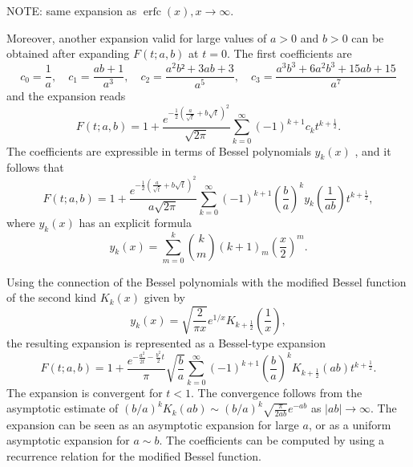 \documentclass[10pt,a4paper,oneside]{article}
\DeclareMathOperator{\erfc}{erfc}
\numberwithin{equation}{section}
\begin{document}
NOTE: same expansion as $\erfc(x), x \to \infty$.

Moreover, another expansion valid for large values of $a > 0$ and $b > 0$ can be obtained after expanding $F(t;a,b)$ at $t=0$. The first coefficients are
\begin{equation}
c_0 = \frac{1}{a}, \quad c_1 = \frac{ab + 1}{a^3}, \quad c_2 = \frac{a^2b² +3ab + 3}{a^5}, \quad c_3 = \frac{a^3b^3 + 6a^2b^3 + 15ab + 15}{a^7}
\end{equation}
and the expansion reads
\begin{equation}
F(t; a, b) = 1 + \frac{e^{-\frac{1}{2} \left(\frac{a}{\sqrt{t}} + b\sqrt{t} \right)^2}}{\sqrt{2\pi}}\sum_{k=0}^{\infty}(-1)^{k+1}c_k t^{k + \frac{1}{2}}.
\end{equation}
The coefficients are expressible in terms of Bessel polynomials $y_k(x)$ \cite[\S A001498]{OEIS}, and it follows that
\begin{equation}
F(t; a, b) = 1 + \frac{e^{-\frac{1}{2} \left(\frac{a}{\sqrt{t}} + b\sqrt{t} \right)^2}}{a\sqrt{2\pi}}\sum_{k=0}^{\infty}(-1)^{k+1} \left(\frac{b}{a}\right)^k y_k\left(\frac{1}{ab}\right) t^{k + \frac{1}{2}},
\end{equation}
where $y_k(x)$ has an explicit formula
\begin{equation}
y_k(x) = \sum_{m=0}^k \binom{k}{m} (k + 1)_m \left(\frac{x}{2}\right)^m.
\end{equation}

Using the connection of the Bessel polynomials with the modified Bessel function of the second kind $K_k(x)$ given by \cite[\S 33.1.3]{Temme2015}
\begin{equation}
y_k(x) = \sqrt{\frac{2}{\pi x}}e^{1/x} K_{k + \frac{1}{2}}\left(\frac{1}{x}\right),
\end{equation}
the resulting expansion is represented as a Bessel-type expansion
\begin{equation}\label{phi_expansion_besselk}
F(t; a, b) = 1 + \frac{e^{-\frac{a^2}{2t} - \frac{b^2}{2}t}}{\pi}\sqrt{\frac{b}{a}}\sum_{k=0}^{\infty} (-1)^{k+1} \left(\frac{b}{a}\right)^k K_{k + \frac{1}{2}}(ab)t^{k + \frac{1}{2}}.
\end{equation}
The expansion is convergent for $t < 1$. The convergence follows from the asymptotic estimate of $(b/a)^k K_k(ab) \sim (b/a)^k \sqrt{\frac{\pi}{2ab}}e^{-ab}$ as $|ab| \to \infty$. The expansion can be seen as an asymptotic expansion for large $a$, or as a uniform asymptotic expansion for $a \sim b$. The coefficients can be computed by using a recurrence relation for the modified Bessel function.
\end{document}
